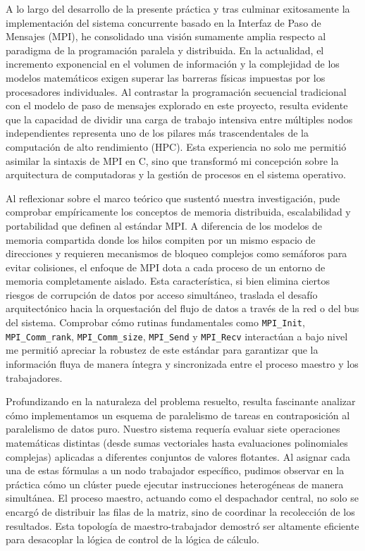 A lo largo del desarrollo de la presente práctica y tras culminar exitosamente la implementación del sistema concurrente basado en la Interfaz de Paso de Mensajes (MPI), he consolidado una visión sumamente amplia respecto al paradigma de la programación paralela y distribuida. En la actualidad, el incremento exponencial en el volumen de información y la complejidad de los modelos matemáticos exigen superar las barreras físicas impuestas por los procesadores individuales. Al contrastar la programación secuencial tradicional con el modelo de paso de mensajes explorado en este proyecto, resulta evidente que la capacidad de dividir una carga de trabajo intensiva entre múltiples nodos independientes representa uno de los pilares más trascendentales de la computación de alto rendimiento (HPC). Esta experiencia no solo me permitió asimilar la sintaxis de MPI en C, sino que transformó mi concepción sobre la arquitectura de computadoras y la gestión de procesos en el sistema operativo.

Al reflexionar sobre el marco teórico que sustentó nuestra investigación, pude comprobar empíricamente los conceptos de memoria distribuida, escalabilidad y portabilidad que definen al estándar MPI. A diferencia de los modelos de memoria compartida donde los hilos compiten por un mismo espacio de direcciones y requieren mecanismos de bloqueo complejos como semáforos para evitar colisiones, el enfoque de MPI dota a cada proceso de un entorno de memoria completamente aislado. Esta característica, si bien elimina ciertos riesgos de corrupción de datos por acceso simultáneo, traslada el desafío arquitectónico hacia la orquestación del flujo de datos a través de la red o del bus del sistema. Comprobar cómo rutinas fundamentales como \texttt{MPI\_Init}, \texttt{MPI\_Comm\_rank}, \texttt{MPI\_Comm\_size}, \texttt{MPI\_Send} y \texttt{MPI\_Recv} interactúan a bajo nivel me permitió apreciar la robustez de este estándar para garantizar que la información fluya de manera íntegra y sincronizada entre el proceso maestro y los trabajadores.

Profundizando en la naturaleza del problema resuelto, resulta fascinante analizar cómo implementamos un esquema de paralelismo de tareas en contraposición al paralelismo de datos puro. Nuestro sistema requería evaluar siete operaciones matemáticas distintas (desde sumas vectoriales hasta evaluaciones polinomiales complejas) aplicadas a diferentes conjuntos de valores flotantes. Al asignar cada una de estas fórmulas a un nodo trabajador específico, pudimos observar en la práctica cómo un clúster puede ejecutar instrucciones heterogéneas de manera simultánea. El proceso maestro, actuando como el despachador central, no solo se encargó de distribuir las filas de la matriz, sino de coordinar la recolección de los resultados. Esta topología de maestro-trabajador demostró ser altamente eficiente para desacoplar la lógica de control de la lógica de cálculo.

